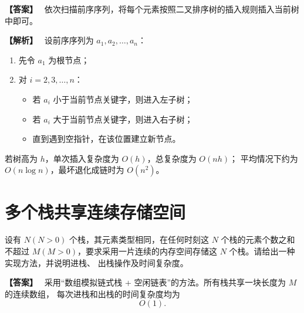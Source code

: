 \documentclass[12pt,a4paper]{ctexart}
\newenvironment{solution}
{\par\noindent\textbf{\color{answerblue}【解析】}\ }
{\par}
\newenvironment{answer}
{\par\noindent\textbf{\color{darkgreen}【答案】}\ }
{\par}
\begin{document}
\begin{answer}
依次扫描前序序列，将每个元素按照二叉排序树的插入规则插入当前树中即可。
\end{answer}

\begin{solution}
设前序序列为 $a_1,a_2,\dots,a_n$：

\begin{enumerate}
  \item 先令 $a_1$ 为根节点；
  \item 对 $i=2,3,\dots,n$：
  \begin{itemize}
    \item 若 $a_i$ 小于当前节点关键字，则进入左子树；
    \item 若 $a_i$ 大于当前节点关键字，则进入右子树；
    \item 直到遇到空指针，在该位置建立新节点。
  \end{itemize}
\end{enumerate}

若树高为 $h$，单次插入复杂度为 $O(h)$，总复杂度为 $O(nh)$；
平均情况下约为 $O(n\log n)$，最坏退化成链时为 $O(n^2)$。
\end{solution}

\section{多个栈共享连续存储空间}

设有 $N(N>0)$ 个栈，其元素类型相同，在任何时刻这 $N$ 个栈的元素个数之和不超过
$M(M>0)$，要求采用一片连续的内存空间存储这 $N$ 个栈。请给出一种实现方法，并说明进栈、
出栈操作及时间复杂度。

\begin{answer}
采用“数组模拟链式栈 + 空闲链表”的方法。所有栈共享一块长度为 $M$ 的连续数组，
每次进栈和出栈的时间复杂度均为
\[
\boxed{O(1)}.
\]
\end{answer}
\end{document}
